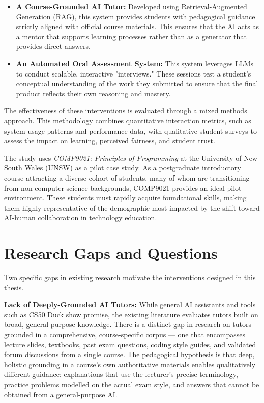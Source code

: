 \begin{itemize}
    \item \textbf{A Course-Grounded AI Tutor:} Developed using Retrieval-Augmented Generation (RAG), this system provides students with pedagogical guidance strictly aligned with official course materials. This ensures that the AI acts as a mentor that supports learning processes rather than as a generator that provides direct answers.
    \item \textbf{An Automated Oral Assessment System:} This system leverages LLMs to conduct scalable, interactive "interviews." These sessions test a student’s conceptual understanding of the work they submitted to ensure that the final product reflects their own reasoning and mastery.
\end{itemize}

The effectiveness of these interventions is evaluated through a mixed methods approach. This methodology combines quantitative interaction metrics, such as system usage patterns and performance data, with qualitative student surveys to assess the impact on learning, perceived fairness, and student trust.

The study uses \textit{COMP9021: Principles of Programming} at the University of New South Wales (UNSW) as a pilot case study. As a postgraduate introductory course attracting a diverse cohort of students, many of whom are transitioning from non-computer science backgrounds, COMP9021 provides an ideal pilot environment. These students must rapidly acquire foundational skills, making them highly representative of the demographic most impacted by the shift toward AI-human collaboration in technology education.

\section{Research Gaps and Questions}

Two specific gaps in existing research motivate the interventions designed in this thesis.

\textbf{Lack of Deeply-Grounded AI Tutors:} While general AI assistants and tools such as CS50 Duck show promise, the existing literature evaluates tutors built on broad, general-purpose knowledge. There is a distinct gap in research on tutors grounded in a comprehensive, course-specific corpus — one that encompasses lecture slides, textbooks, past exam questions, coding style guides, and validated forum discussions from a single course. The pedagogical hypothesis is that deep, holistic grounding in a course's own authoritative materials enables qualitatively different guidance: explanations that use the lecturer's precise terminology, practice problems modelled on the actual exam style, and answers that cannot be obtained from a general-purpose AI.


